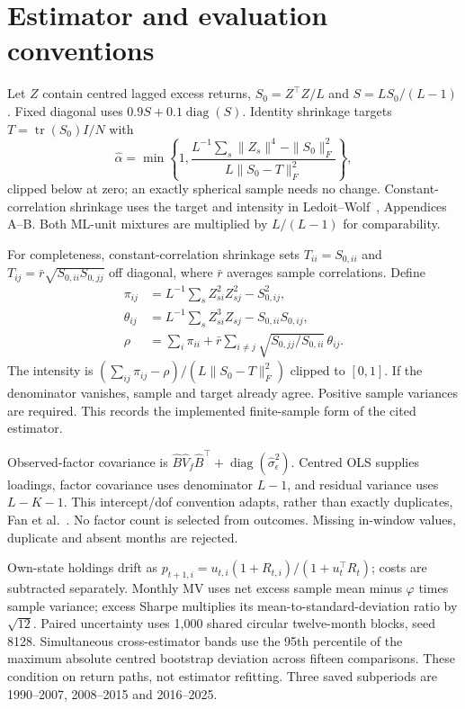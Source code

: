 \documentclass[sigconf,anonymous,review]{acmart}
\begin{document}
\section{Estimator and evaluation conventions}\label{app:estimators}
Let $Z$ contain centred lagged excess returns, $S_0=Z^\top Z/L$ and $S=L S_0/(L-1)$. Fixed diagonal uses $0.9S+0.1\operatorname{diag}(S)$. Identity shrinkage targets $T=\operatorname{tr}(S_0)I/N$ with
\[
\widehat\alpha=\min\!\left\{1,
\frac{L^{-1}\sum_s\|Z_s\|^4-\|S_0\|_F^2}
{L\|S_0-T\|_F^2}\right\},
\]
clipped below at zero; an exactly spherical sample needs no change. Constant-correlation shrinkage uses the target and intensity in Ledoit--Wolf~\cite{ledoit2004correlation}, Appendices A--B. Both ML-unit mixtures are multiplied by $L/(L-1)$ for comparability.

For completeness, constant-correlation shrinkage sets $T_{ii}=S_{0,ii}$ and $T_{ij}=\bar r\sqrt{S_{0,ii}S_{0,jj}}$ off diagonal, where $\bar r$ averages sample correlations. Define
\begin{align*}
\pi_{ij}&=L^{-1}\sum_s Z_{si}^2Z_{sj}^2-S_{0,ij}^2,\\
\theta_{ij}&=L^{-1}\sum_s Z_{si}^3Z_{sj}-S_{0,ii}S_{0,ij},\\
\rho&=\sum_i\pi_{ii}+\bar r\sum_{i\ne j}
\sqrt{S_{0,jj}/S_{0,ii}}\,\theta_{ij}.
\end{align*}
The intensity is $(\sum_{ij}\pi_{ij}-\rho)/(L\|S_0-T\|_F^2)$ clipped to $[0,1]$. If the denominator vanishes, sample and target already agree. Positive sample variances are required. This records the implemented finite-sample form of the cited estimator.


Observed-factor covariance is $\widehat B\widehat V_f\widehat B^\top+\operatorname{diag}(\widehat\sigma_\epsilon^2)$. Centred OLS supplies loadings, factor covariance uses denominator $L-1$, and residual variance uses $L-K-1$. This intercept/dof convention adapts, rather than exactly duplicates, Fan et al.~\cite{fan2008}. No factor count is selected from outcomes. Missing in-window values, duplicate and absent months are rejected.

Own-state holdings drift as $p_{t+1,i}=u_{t,i}(1+R_{t,i})/(1+u_t^\top R_t)$; costs are subtracted separately. Monthly MV uses net excess sample mean minus $\varphi$ times sample variance; excess Sharpe multiplies its mean-to-standard-deviation ratio by $\sqrt{12}$. Paired uncertainty uses 1,000 shared circular twelve-month blocks, seed 8128. Simultaneous cross-estimator bands use the 95th percentile of the maximum absolute centred bootstrap deviation across fifteen comparisons. These condition on return paths, not estimator refitting. Three saved subperiods are 1990--2007, 2008--2015 and 2016--2025.
\end{document}
